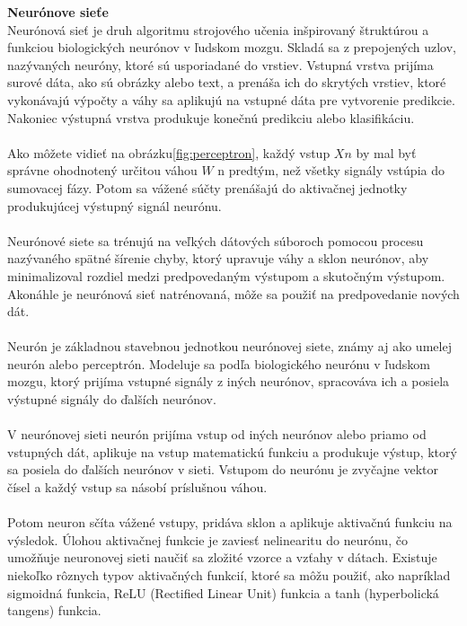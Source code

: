     \textbf{Neurónove sieťe} \\
    Neurónová sieť je druh algoritmu strojového učenia inšpirovaný štruktúrou a funkciou biologických neurónov v
    ľudskom mozgu. Skladá sa z prepojených uzlov, nazývaných neuróny, ktoré sú usporiadané do vrstiev. Vstupná vrstva
    prijíma surové dáta, ako sú obrázky alebo text, a prenáša ich do skrytých vrstiev, ktoré vykonávajú výpočty a váhy
    sa aplikujú na vstupné dáta pre vytvorenie predikcie. Nakoniec výstupná vrstva produkuje konečnú predikciu
    alebo klasifikáciu.\\
    \\
    Ako môžete vidieť na obrázku\ref{fig:perceptron}, každý vstup $Xn$ by mal byť správne ohodnotený určitou
    váhou $W$ n predtým, než všetky signály vstúpia do sumovacej fázy. Potom sa vážené súčty prenášajú do aktivačnej
    jednotky produkujúcej výstupný signál neurónu.\\
    \\
    Neurónové siete sa trénujú na veľkých dátových súboroch pomocou procesu nazývaného spätné šírenie chyby, ktorý
    upravuje váhy a sklon neurónov, aby minimalizoval rozdiel medzi predpovedaným výstupom a skutočným výstupom.
    Akonáhle je neurónová sieť natrénovaná, môže sa použiť na predpovedanie nových dát.\\
    \\
    Neurón je základnou stavebnou jednotkou neurónovej siete, známy aj ako umelej neurón alebo perceptrón.
    Modeluje sa podľa biologického neurónu v ľudskom mozgu, ktorý prijíma vstupné signály z iných neurónov,
    spracováva ich a posiela výstupné signály do ďalších neurónov.\\
    \\
    V neurónovej sieti neurón prijíma vstup od iných neurónov alebo priamo od vstupných dát, aplikuje na vstup
    matematickú funkciu a produkuje výstup, ktorý sa posiela do ďalších neurónov v sieti. Vstupom do neurónu je
    zvyčajne vektor čísel a každý vstup sa násobí príslušnou váhou.\\
    \\
    Potom neuron sčíta vážené vstupy, pridáva sklon a aplikuje aktivačnú funkciu na výsledok. Úlohou aktivačnej
    funkcie je zaviesť nelinearitu do neurónu, čo umožňuje neuronovej sieti naučiť sa zložité vzorce a vzťahy v dátach.
    Existuje niekoľko rôznych typov aktivačných funkcií, ktoré sa môžu použiť, ako napríklad sigmoidná funkcia,
    ReLU (Rectified Linear Unit) funkcia a tanh (hyperbolická tangens) funkcia.\\
